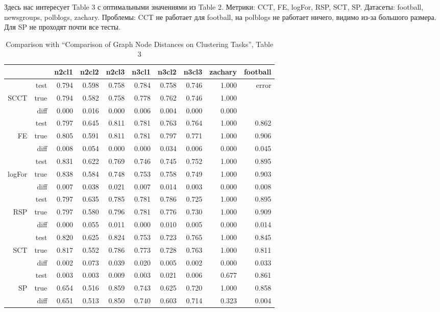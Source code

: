 \documentclass{article}
\begin{document}
Здесь нас интересует Table 3 с оптимальными значениями из Table 2.
Метрики: CCT, FE, logFor, RSP, SCT, SP.
Датасеты: football, newsgroups, polblogs, zachary.
Проблемы: CCT не работает для football, на polblogs не работает ничего, видимо из-за большого размера. Для SP не проходят почти все тесты.

\begin{table}[H]
\centering
\caption{Comparison with ``Comparison of Graph Node Distances on Clustering Tasks'', Table 3}
\label{my-label}
\begin{tabular}{rr|rrrrrrrr}
       &      & n2cl1 & n2cl2 & n2cl3 & n3cl1 & n3cl2 & n3cl3 & zachary & football \\
       \hline
       & test & 0.794 & 0.598 & 0.758 & 0.784 & 0.758 & 0.746 & 1.000   & \cellcolor{red!25} error    \\
SCCT   & true & 0.794 & 0.582 & 0.758 & 0.778 & 0.762 & 0.746 & 1.000   &          \\
       & diff & 0.000 & 0.016 & 0.000 & 0.006 & 0.004 & 0.000 & 0.000   &          \\
       \hline
       & test & 0.797 & 0.645 & 0.811 & 0.781 & 0.763 & 0.764 & 1.000   & 0.862    \\
FE     & true & 0.805 & 0.591 & 0.811 & 0.781 & 0.797 & 0.771 & 1.000   & 0.906    \\
       & diff & 0.008 & 0.054 & 0.000 & 0.000 & 0.034 & 0.006 & 0.000   & 0.045    \\
       \hline
       & test & 0.831 & 0.622 & 0.769 & 0.746 & 0.745 & 0.752 & 1.000   & 0.895    \\
logFor & true & 0.838 & 0.584 & 0.748 & 0.753 & 0.758 & 0.749 & 1.000   & 0.903    \\
       & diff & 0.007 & 0.038 & 0.021 & 0.007 & 0.014 & 0.003 & 0.000   & 0.008    \\
       \hline
       & test & 0.797 & 0.635 & 0.785 & 0.781 & 0.786 & 0.725 & 1.000   & 0.895    \\
RSP    & true & 0.797 & 0.580 & 0.796 & 0.781 & 0.776 & 0.730 & 1.000   & 0.909    \\
       & diff & 0.000 & 0.055 & 0.011 & 0.000 & 0.010 & 0.005 & 0.000   & 0.014    \\
       \hline
       & test & 0.820 & 0.625 & 0.824 & 0.753 & 0.723 & 0.765 & 1.000   & 0.845    \\
SCT    & true & 0.817 & 0.552 & 0.786 & 0.773 & 0.728 & 0.763 & 1.000   & 0.811    \\
       & diff & 0.002 & 0.073 & 0.039 & 0.020 & 0.005 & 0.002 & 0.000   & 0.033    \\
       \hline
       & test & 0.003 & 0.003 & 0.009 & 0.003 & 0.021 & 0.006 & 0.677   & 0.861    \\
SP     & true & 0.654 & 0.516 & 0.859 & 0.743 & 0.625 & 0.720 & 1.000   & 0.858    \\
       & diff & \cellcolor{red!25} 0.651 & \cellcolor{red!25} 0.513 & \cellcolor{red!25} 0.850 &
                \cellcolor{red!25} 0.740 & \cellcolor{red!25} 0.603 & \cellcolor{red!25} 0.714 & \cellcolor{yellow!25} 0.323   & 0.004   
\end{tabular}
\end{table}
\end{document}
